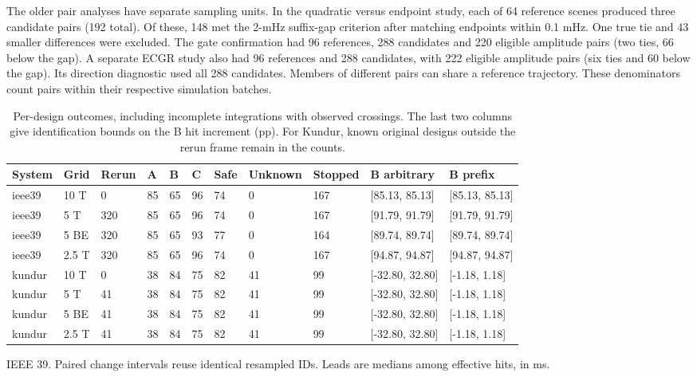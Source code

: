 \documentclass[10pt]{article}
\begin{document}
The older pair analyses have separate sampling units. In the quadratic versus endpoint study, each of 64 reference scenes produced three candidate pairs (192 total). Of these, 148 met the 2-mHz suffix-gap criterion after matching endpoints within 0.1 mHz. One true tie and 43 smaller differences were excluded. The gate confirmation had 96 references, 288 candidates and 220 eligible amplitude pairs (two ties, 66 below the gap). A separate ECGR study also had 96 references and 288 candidates, with 222 eligible amplitude pairs (six ties and 60 below the gap). Its direction diagnostic used all 288 candidates. Members of different pairs can share a reference trajectory. These denominators count pairs within their respective simulation batches.
\begin{table}[htbp]\centering\footnotesize\setlength{\tabcolsep}{4pt}
\caption{Per-design outcomes, including incomplete integrations with observed crossings. The last two columns give identification bounds on the B hit increment (pp). For Kundur, known original designs outside the rerun frame remain in the counts.}\label{tab:r2ledger}
\begin{tabular}{@{}lllllllllll@{}}
\toprule System & Grid & Rerun & A & B & C & Safe & Unknown & Stopped & B arbitrary & B prefix \\\midrule
ieee39 & 10 T & 0 & 85 & 65 & 96 & 74 & 0 & 167 & [85.13, 85.13] & [85.13, 85.13] \\
ieee39 & 5 T & 320 & 85 & 65 & 96 & 74 & 0 & 167 & [91.79, 91.79] & [91.79, 91.79] \\
ieee39 & 5 BE & 320 & 85 & 65 & 93 & 77 & 0 & 164 & [89.74, 89.74] & [89.74, 89.74] \\
ieee39 & 2.5 T & 320 & 85 & 65 & 96 & 74 & 0 & 167 & [94.87, 94.87] & [94.87, 94.87] \\
kundur & 10 T & 0 & 38 & 84 & 75 & 82 & 41 & 99 & [-32.80, 32.80] & [-1.18, 1.18] \\
kundur & 5 T & 41 & 38 & 84 & 75 & 82 & 41 & 99 & [-32.80, 32.80] & [-1.18, 1.18] \\
kundur & 5 BE & 41 & 38 & 84 & 75 & 82 & 41 & 99 & [-32.80, 32.80] & [-1.18, 1.18] \\
kundur & 2.5 T & 41 & 38 & 84 & 75 & 82 & 41 & 99 & [-32.80, 32.80] & [-1.18, 1.18] \\
\bottomrule\end{tabular}\end{table}\begin{table}[htbp]\centering\footnotesize\setlength{\tabcolsep}{4pt}
\caption{IEEE 39. Paired change intervals reuse identical resampled IDs. Leads are medians among effective hits, in ms.}\label{tab:r2changes}

\end{table}
\end{document}
